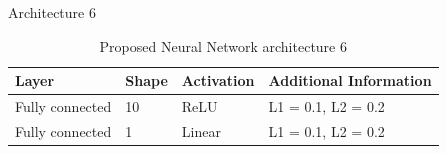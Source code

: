 \documentclass[12pt]{IEEEtran}%
\begin{document}
\pagebreak

Architecture 6

\begin{table}[!htb]
\centering
\begin{tabular}{l l l l}
	\hline
	Layer & Shape & Activation & Additional Information\\
  	\hline
  	Fully connected & 10 & ReLU & L1 = 0.1, L2 = 0.2\\
  	Fully connected & 1 & Linear & L1 = 0.1, L2 = 0.2\\
  	\hline
\end{tabular}
\caption{Proposed Neural Network architecture 6}
\label{table:proposed_nn_6}
\end{table}






%


%
\end{document}
